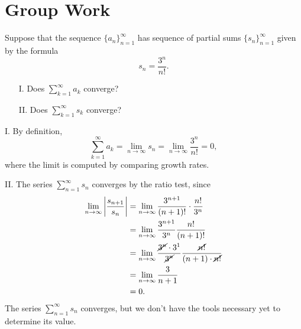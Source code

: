 \documentclass[noauthor]{ximera}
\begin{document}
\section{Group Work}
\begin{problem}
Suppose that the sequence $\{a_n\}_{n=1}^\infty$ has sequence of partial sums $\{s_n\}_{n=1}^\infty$ given by the formula
$$
s_n = \frac{3^n}{n!}.
$$
\begin{itemize}
\item[I.] Does $\sum_{k=1}^\infty a_k$ converge?
\item[II.] Does $\sum_{k=1}^\infty s_k$ converge?
\end{itemize}

\begin{freeResponse}
I. By definition,
$$
\sum_{k=1}^\infty a_k = \lim_{n\rightarrow \infty} s_n = \lim_{n\rightarrow \infty} \frac{3^n}{n!} = 0,
$$
where the limit is computed by comparing growth rates. 

II. The series $\sum_{n=1}^{\infty} s_n$ converges by the ratio test, since
\begin{align*}
\lim_{n \rightarrow \infty} \left|\frac{s_{n+1}}{s_n} \right| &= \lim_{n \rightarrow \infty} \frac{3^{n+1}}{(n+1)!} \cdot \frac{n!} {3^n} \\
&= \lim_{n \rightarrow \infty} \frac{3^{n+1}}{3^n} \frac{n!}{(n+1)!} \\
&= \lim_{n \rightarrow \infty} \frac{\cancel{3^n} \cdot 3^1}{\cancel{3^n}} \frac{\cancel{n!}}{(n+1) \cdot\cancel{n!}} \\
&= \lim_{n \rightarrow \infty} \frac{3}{n+1} \\
&= 0.
\end{align*}
The series $\sum_{n=1}^{\infty} s_n$ converges, but we don't have the tools necessary yet to determine its value. 
\end{freeResponse}


\end{problem}
\end{document}
